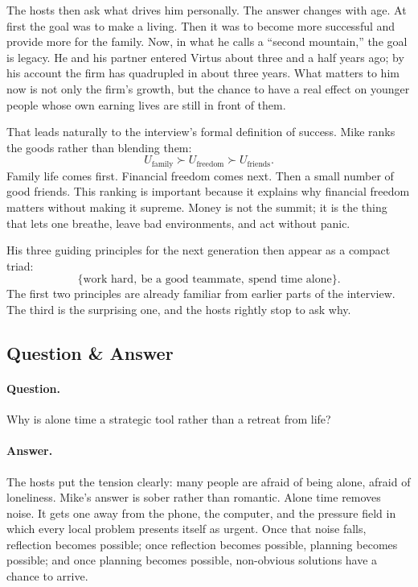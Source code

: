 The hosts then ask what drives him personally. The answer changes with age. At first the goal was to make a living. Then it was to become more successful and provide more for the family. Now, in what he calls a ``second mountain,'' the goal is legacy. He and his partner entered Virtus about three and a half years ago; by his account the firm has quadrupled in about three years. What matters to him now is not only the firm's growth, but the chance to have a real effect on younger people whose own earning lives are still in front of them.

That leads naturally to the interview's formal definition of success. Mike ranks the goods rather than blending them:
\begin{equation}
U_{\text{family}} \succ U_{\text{freedom}} \succ U_{\text{friends}}.
\end{equation}
Family life comes first. Financial freedom comes next. Then a small number of good friends. This ranking is important because it explains why financial freedom matters without making it supreme. Money is not the summit; it is the thing that lets one breathe, leave bad environments, and act without panic.

His three guiding principles for the next generation then appear as a compact triad:
\begin{equation}
\{\text{work hard},\ \text{be a good teammate},\ \text{spend time alone}\}.
\end{equation}
The first two principles are already familiar from earlier parts of the interview. The third is the surprising one, and the hosts rightly stop to ask why.

\subsection{Question \& Answer}

\paragraph{Question.} Why is alone time a strategic tool rather than a retreat from life?

\paragraph{Answer.} The hosts put the tension clearly: many people are afraid of being alone, afraid of loneliness. Mike's answer is sober rather than romantic. Alone time removes noise. It gets one away from the phone, the computer, and the pressure field in which every local problem presents itself as urgent. Once that noise falls, reflection becomes possible; once reflection becomes possible, planning becomes possible; and once planning becomes possible, non-obvious solutions have a chance to arrive.

